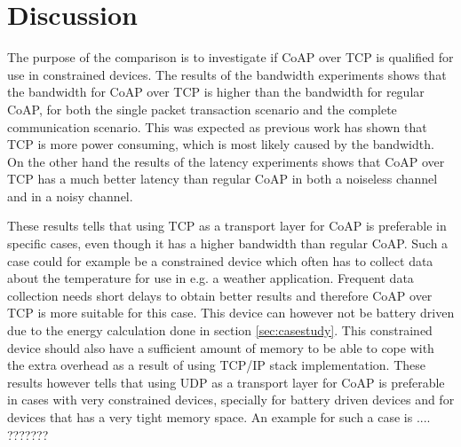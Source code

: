 \section{Discussion}
The purpose of the comparison is to investigate if CoAP over TCP is qualified for use in constrained devices. The results of the bandwidth experiments shows that the bandwidth for CoAP over TCP is higher than the bandwidth for regular CoAP, for both the single packet transaction scenario and the complete communication scenario. This was expected as previous work has shown that TCP is more power consuming, which is most likely caused by the bandwidth.
On the other hand the results of the latency experiments shows that CoAP over TCP has a much better latency than regular CoAP in both a noiseless channel and in a noisy channel. 

These results tells that using TCP as a transport layer for CoAP  is preferable in specific cases, even though it has a higher bandwidth than regular CoAP. 
Such a case could for example be a constrained device which often has to collect data about the temperature for use in e.g. a weather application. Frequent data collection needs short delays to obtain better results and therefore CoAP over TCP is more suitable for this case. This device can however not be battery driven due to the energy calculation done in section \ref{sec:casestudy}. This constrained device should also have a sufficient amount of memory to be able to cope with the extra overhead as a result of using TCP/IP stack implementation. 
These results however tells that using UDP as a transport layer for CoAP is preferable in cases with very constrained devices, specially for battery driven devices and for devices that has a very tight memory space. An example for such a case is .... ??????? 


%
%



	




